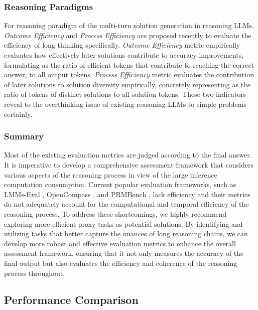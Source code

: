 \subsubsection{Reasoning Paradigms}

For reasoning paradigm of the multi-turn solution generation in reasoning LLMs, \textit{Outcome Efficiency} and \textit{Process Efficiency} \cite{Tecent_2_plus_3} are proposed recently to evaluate the efficiency of long thinking specifically. \textit{Outcome Efficiency} metric empirically evaluates how effectively later solutions contribute to accuracy improvements, formulating as the ratio of efficient tokens that contribute to reaching the correct answer, to all output tokens. \textit{Process Efficiency} metric evaluates the contribution of later solutions to solution diversity empirically, concretely representing as the ratio of tokens of distinct solutions to all solution tokens. These two indicators reveal to the overthinking issue of existing reasoning LLMs to simple problems certainly.


\subsubsection{Summary} 

Most of the existing evaluation metrics are judged according to the final answer. 
It is imperative to develop a comprehensive assessment framework that considers various aspects of the reasoning process in view of the large inference computation consumption. 
Current popular evaluation frameworks, such as LMMs-Eval \cite{zhang2024lmmsevalrealitycheckevaluation}, OpenCompass \cite{2023opencompass}, and PRMBench \cite{song2025prmbench}, lack efficiency and their metrics do not adequately account for the computational and temporal efficiency of the reasoning process. 
To address these shortcomings, we highly recommend exploring more efficient proxy tasks as potential solutions. 
By identifying and utilizing tasks that better capture the nuances of long reasoning chains, we can develop more robust and effective evaluation metrics to enhance the overall assessment framework, ensuring that it not only measures the accuracy of the final output but also evaluates the efficiency and coherence of the reasoning process throughout.





\subsection{Performance Comparison}\label{performance_compare}

